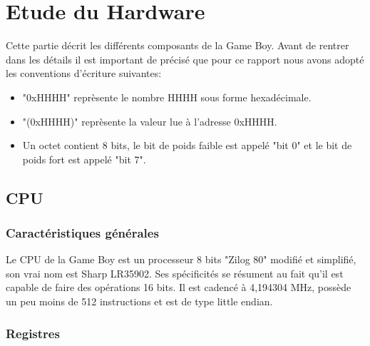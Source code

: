 \documentclass{report}
\begin{document}
\chapter{Etude du Hardware}
Cette partie décrit les différents composants de la Game Boy. Avant de rentrer dans les détails il est important de précisé que pour ce rapport nous avons adopté les conventions d'écriture suivantes:
\begin{itemize}
\item{"0xHHHH" reprèsente le nombre HHHH sous forme hexadécimale.}
\item{"(0xHHHH)" reprèsente la valeur lue à l'adresse 0xHHHH.}
\item{Un octet contient 8 bits, le bit de poids faible est appelé "bit 0" et le bit de poids fort est appelé "bit 7".}
\end{itemize}
\section{CPU}
\subsection{Caractéristiques générales}
Le CPU de la Game Boy est un processeur 8 bits "Zilog 80" modifié et simplifié, son vrai nom est Sharp LR35902.
Ses spécificités se résument au fait qu'il est capable de faire des opérations 16 bits.
Il est cadencé à 4,194304 MHz, possède un peu moins de 512 instructions et est de type little endian.
\subsection{Registres}
\end{document}
